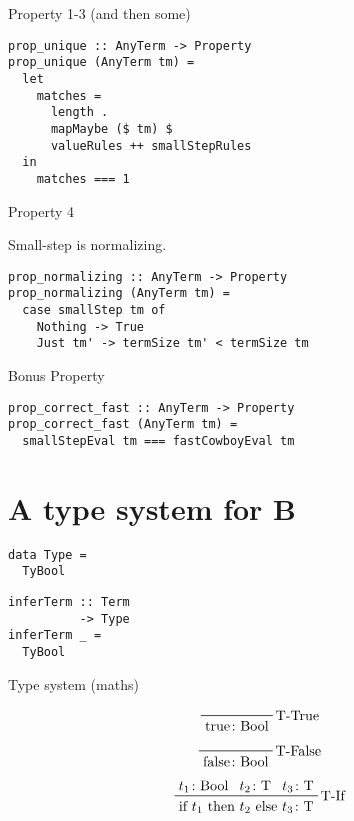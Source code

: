 \documentclass[aspectration=169]{beamer}
\begin{document}
\begin{frame}[fragile]
Property 1-3 (and then some)
  \begin{verbatim}
prop_unique :: AnyTerm -> Property
prop_unique (AnyTerm tm) =
  let
    matches =
      length .
      mapMaybe ($ tm) $
      valueRules ++ smallStepRules
  in
    matches === 1
  \end{verbatim}
\end{frame}

\begin{frame}[fragile]
  Property 4
  \begin{center}
Small-step is normalizing.
  \end{center}
  \begin{verbatim}
prop_normalizing :: AnyTerm -> Property
prop_normalizing (AnyTerm tm) =
  case smallStep tm of
    Nothing -> True
    Just tm' -> termSize tm' < termSize tm
  \end{verbatim}
\end{frame}

\begin{frame}[fragile]
  Bonus Property
  \begin{verbatim}
prop_correct_fast :: AnyTerm -> Property
prop_correct_fast (AnyTerm tm) =
  smallStepEval tm === fastCowboyEval tm
  \end{verbatim}
\end{frame}

\section{A type system for B}

\begin{frame}[fragile]
  \begin{verbatim}
data Type =
  TyBool
  \end{verbatim}
\end{frame}

\begin{frame}[fragile]
  \begin{verbatim}
inferTerm :: Term 
          -> Type
inferTerm _ =
  TyBool
  \end{verbatim}
\end{frame}

\begin{frame}[c]
  \begin{center}
Type system (maths)
  \end{center}
  \begin{displaymath}
    \prftree[r]{T-True}
    {\text{true} \colon \text{Bool}}
  \end{displaymath}
  \begin{displaymath}
    \prftree[r]{T-False}
    {\text{false} \colon \text{Bool}}
  \end{displaymath}
  \begin{displaymath}
    \prftree[r]{T-If}
    {t_1 \colon \text{Bool}}
    {t_2 \colon \text{T}}
    {t_3 \colon \text{T}}
    {\text{if $t_1$ then $t_2$ else $t_3$} \colon \text{T}}
  \end{displaymath}
\end{frame}
\end{document}
